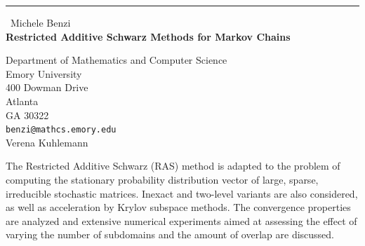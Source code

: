 \documentclass{report}
\begin{document}
\begin{center}
\rule{6in}{1pt} \
{\large Michele Benzi \\
{\bf Restricted Additive Schwarz Methods for Markov Chains}}

Department of Mathematics and Computer Science \\ Emory University \\ 400 Dowman Drive \\ Atlanta \\ GA 30322
\\
{\tt benzi@mathcs.emory.edu}\\
Verena Kuhlemann\end{center}

The Restricted Additive Schwarz (RAS) method is adapted to the
problem of computing the stationary probability distribution
vector of large, sparse, irreducible stochastic matrices.
Inexact and two-level variants are also considered, as
well as acceleration by Krylov subspace methods.
The convergence properties are analyzed and extensive
numerical experiments aimed at assessing the effect of
varying the number of subdomains and the amount of overlap
are discussed.
\end{document}
